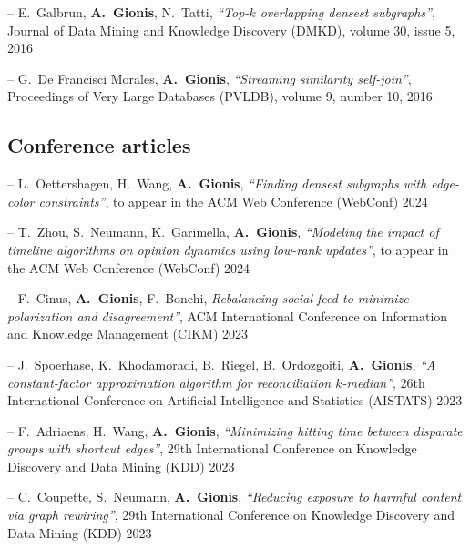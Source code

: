 \documentclass[a4paper,11pt]{article}
\begin{document}
\item[--]
{E.\ Galbrun, \textbf{A.\ Gionis}, N.\ Tatti}, 
{\em ``Top-$k$ overlapping densest subgraphs''}, 
Journal of Data Mining and Knowledge Discovery (DMKD), volume 30, issue 5, 2016

\item[--]
{G.\ De Francisci Morales, \textbf{A.\ Gionis}}, 
{\em ``Streaming similarity self-join''}, 
Proceedings of Very Large Databases (PVLDB), volume 9, number 10, 2016

\biblistend


\subsection{Conference articles}

\biblist

\item[--]
{L.\ Oettershagen, H.\ Wang, \textbf{A.\ Gionis}},
{\em ``Finding densest subgraphs with edge-color constraints''},
to appear in the ACM Web Conference (WebConf) 2024

\item[--]
{T.\ Zhou, S.\ Neumann, K.\ Garimella, \textbf{A.\ Gionis}},
{\em ``Modeling the impact of timeline algorithms on opinion dynamics using low-rank updates''},
to appear in the ACM Web Conference (WebConf) 2024

\item[--]
{F.\ Cinus, \textbf{A.\ Gionis}, F.\ Bonchi},
{\em Rebalancing social feed to minimize polarization and disagreement''}, 
ACM International Conference on Information and Knowledge Management (CIKM) 2023

\item[--] 
{J.\ Spoerhase, K.\ Khodamoradi, B.\ Riegel, B.\ Ordozgoiti, \textbf{A.\ Gionis}},
{\em ``A constant-factor approximation algorithm for reconciliation $k$-median''}, 
26th International Conference on Artificial Intelligence and Statistics (AISTATS) 2023

\item[--] 
{F.\ Adriaens, H.\ Wang, \textbf{A.\ Gionis}},
{\em ``Minimizing hitting time between disparate groups with shortcut edges''},
29th International Conference on Knowledge Discovery and Data Mining (KDD) 2023

\item[--] 
{C.\ Coupette, S.\ Neumann, \textbf{A.\ Gionis}},
{\em ``Reducing exposure to harmful content via graph rewiring''},
29th International Conference on Knowledge Discovery and Data Mining (KDD) 2023
\end{document}
